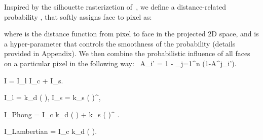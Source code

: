 \documentclass{article}
\begin{document}
Inspired by the silhouette rasterizetion of~\cite{liu2019soft}, we define a distance-related probability , that softly assigns face  to pixel  as:

where  is the distance function from pixel  to face  in the projected 2D space, and  is a hyper-parameter that controls the smoothness of the probability (details provided in Appendix). We then combine the probabilistic influence of all faces on a particular pixel in the following way: \
	{A_{i'}} = 1 - \prod_{j=1}^n (1-{A^j_{i'}}).
	\label{equation:diff5}

I = I_l I_c + I_s. 

I_l = k_d ( \cdot {}), \quad   \quad I_s = k_s ( \cdot {})^{\alpha},

I_{Phong} = I_c k_d ( \cdot {})  + k_s ( \cdot {})^{\alpha} . 

I_{Lambertian} = I_c k_d ( \cdot {}). 
\end{document}
